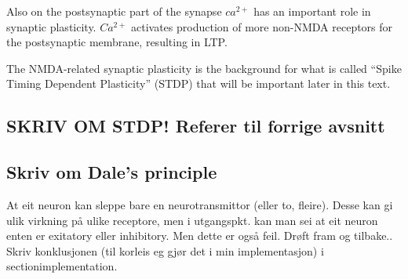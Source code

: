 Also on the postsynaptic part of the synapse $ca^{2+}$ has an important role in synaptic plasticity. 
$Ca^{2+}$ activates production of more non-NMDA receptors for the postsynaptic membrane, resulting in LTP\cite{AMPARtrafficingArtikkel}.%

The NMDA-related synaptic plasticity is the background for what is called ``Spike Timing Dependent Plasticity'' (STDP) that will be important later in this text.

\subsection{SKRIV OM STDP! Referer til forrige avsnitt}
\label{forklaringBakSTDP} %

\subsection{Skriv om Dale's  principle}
At eit neuron kan sleppe bare en neurotransmittor (eller to, fleire). Desse kan gi ulik virkning på ulike receptore, men i utgangspkt. kan man sei at eit neuron enten er exitatory eller inhibitory. 
Men dette er også feil. Drøft fram og tilbake.. Skriv konklusjonen (til korleis eg gjør det i min implementasjon) i section{implementation}.






